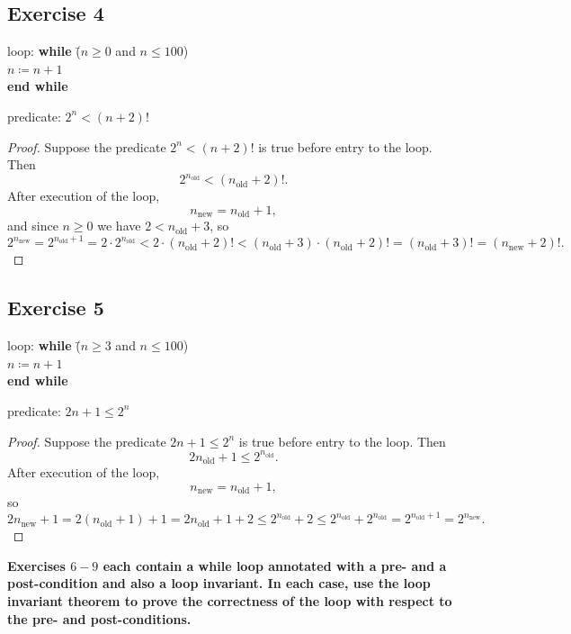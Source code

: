 \documentclass[14pt]{extarticle}
\newcommand{\cy}{\color{cyan}}
\begin{document}
\subsection{Exercise 4}
\begin{tabbing}
loop: \hspace{1cm} 
\= {\bf while} \= ($n \geq 0$ and $n \leq 100$) \\
\>             \> $n \coloneqq n + 1$ \\
\> {\bf end while} 
\end{tabbing}
predicate: $2^n < (n+2)!$

\begin{proof}
Suppose the predicate $2^n < (n+2)!$ is true before entry to the loop. Then 
\[
2^{n_{\text{old}}} < (n_{\text{old}} + 2)!.
\]
After execution of the loop,
\[
n_{\text{new}} = n_{\text{old}} + 1,
\]
and since $n \geq 0$ we have $2 < n_{\text{old}} + 3$, so
\[
2^{n_{\text{new}}} = 2^{n_{\text{old}} + 1} = 2 \cdot 2^{n_{\text{old}}} < 2 \cdot (n_{\text{old}} + 2)! < (n_{\text{old}} + 3) \cdot (n_{\text{old}} + 2)! = (n_{\text{old}} + 3)! = (n_{\text{new}} + 2)!.
\]
\end{proof}

\subsection{Exercise 5}
\begin{tabbing}
loop: \hspace{1cm} 
\= {\bf while} \= ($n \geq 3$ and $n \leq 100$) \\
\>             \> $n \coloneqq n + 1$ \\
\> {\bf end while} 
\end{tabbing}
predicate: $2n + 1 \leq 2^n$

\begin{proof}
Suppose the predicate $2n + 1 \leq 2^n$ is true before entry to the loop. Then 
\[
2n_{\text{old}} + 1 \leq 2^{n_{\text{old}}}.
\]
After execution of the loop,
\[
n_{\text{new}} = n_{\text{old}} + 1,
\]
so
\[
2n_{\text{new}} + 1 = 2(n_{\text{old}} + 1) + 1 = 2n_{\text{old}} + 1 + 2 \leq 2^{n_{\text{old}}} + 2 \leq 2^{n_{\text{old}}} + 2^{n_{\text{old}}} = 2^{n_{\text{old}} + 1} = 2^{n_{\text{new}}}.
\]
\end{proof}

{\bf \cy Exercises $6-9$ each contain a while loop annotated with a pre- and a post-condition and also a loop 
invariant. In each case, use the loop invariant theorem to prove the correctness of the loop with respect to the pre- 
and post-conditions.}
\end{document}
